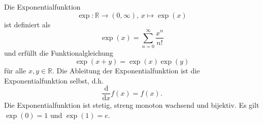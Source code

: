 \documentclass[12pt]{article}
\newcommand{\ddx}{\frac{\mathrm{d}}{\mathrm{d}x}}
\newcommand{\R}{\mathbb{R}} %
\newenvironment{definition}[2][Definition]{\begin{trivlist}
        \item[\hskip \labelsep {\bfseries #1}\hskip \labelsep {\bfseries #2.}]}{\flushright{$\square$}\end{trivlist}}
\begin{document}
\begin{definition}{[Exponentialfunktion]}
        Die Exponentialfunktion
        \begin{equation}
                \exp: \R\to\left(0,\infty\right),\,x\mapsto\exp(x)
        \end{equation} ist definiert als
        \begin{equation}
                \exp(x)=\sum_{n=0}^{\infty}\frac{x^n}{n!}
        \end{equation}
        und erfüllt die Funktionalgleichung
        \begin{equation}
                \exp(x+y)=\exp(x)\exp(y)
        \end{equation}
        für alle $x,y\in\R$. Die Ableitung der Exponentialfunktion ist die Exponentialfunktion selbst, d.h.
        \begin{equation}
                \ddx{f}(x)=f(x).
        \end{equation}
        Die Exponentialfunktion ist stetig, streng monoton wachsend und bijektiv. Es gilt $\exp(0)=1$ und $\exp(1)=e$.
\end{definition}
\end{document}
